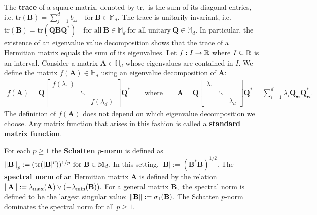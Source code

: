   The \textbf{trace} of a square matrix, denoted by $\mathrm{tr},$
  is the sum of its diagonal entries, i.e. 
  $
    \mathrm{tr}(\mathbf{B})
    =
    \sum_{j=1}^{d}b_{jj}
    \quad 
    \text{for}\ 
    \mathbf{B} \in \mathbb{M}_d.
  $
  The trace is unitarily invariant, i.e.
  $
    \mathrm{tr}(\mathbf{B})
    =
    \mathrm{tr}(\mathbf{Q}\mathbf{B}\mathbf{Q}^*)
    \quad 
    \text{for all}
    \ 
    \mathbf{B}\in \mathbb{M}_d
    \ 
    \text{for all unitary}\ 
    \mathbf{Q} \in \mathbb{M}_d.
  $
  In particular, the existence of an eigenvalue value decomposition shows 
  that the trace of a Hermitian matrix equals the sum of its  eigenvalues.
  Let
  $
  f: I\to \mathbb{R}
  $
  where 
  $I\subseteq\mathbb{R}$ 
  is an interval.
  Consider a matrix 
  $\mathbf{A}\in \mathbb{H}_d$
  whose eigenvalues are contained in $I.$
  We define the matrix 
  $
    f(\mathbf{A})\in \mathbb{H}_d
  $
  using an eigenvalue decomposition of $\mathbf{A}:$
  \begin{gather}
    f(\mathbf{A})
    =
    \mathbf{Q}
    \begin{bmatrix}
      f(\lambda_1) &&\\
                   &\ddots&\\
                   && f(\lambda_d)
    \end{bmatrix}
    \mathbf{Q}^*
    \qquad
    \text{where}
    \qquad
    \mathbf{A}
    =
    \mathbf{Q}
    \begin{bmatrix}
      \lambda_1 &&\\
                   &\ddots&\\
                   && \lambda_d
    \end{bmatrix}
    \mathbf{Q}^*
    =
    \sum_{i=1}^{d} 
    \lambda_i
    \mathbf{Q}_{\bullet i}
    \mathbf{Q}_{\bullet i}^*
    .
  \end{gather}
  The definition of $f(\mathbf{A})$ does not depend on which 
  eigenvalue decomposition we choose.
  Any matrix function that arises in this fashion is called a \textbf{standard matrix function}.

  For each $p\ge 1$
  the \textbf{Schatten $p$-norm} is defined as 
  $
    \norm{\mathbf{B}}_p
    :=
    (
    \mathrm{tr}(\left| \mathbf{B} \right|^p)
    )
    ^{1/p}
    \ 
    \text{for}
    \ 
    \mathbf{B} \in \mathbb{M}_d.
  $
  In this setting,
  $
  \left| \mathbf{B} \right|
  :=
  (
    \mathbf{B}^*
    \mathbf{B}
    )^{1/2}
    .
  $
  The \textbf{spectral norm}
  of an Hermitian matrix $\mathbf{A}$
  is defined by the relation
  $
    \left\lVert\mathbf{A}\right\rVert
    :=
    \lambda_{\mathrm{max}}(\mathbf{A})
    \lor
    (
    -\lambda_{\mathrm{min}}(\mathbf{B})
    )
    .
  $
  For a general matrix $\mathbf{B},$
  the spectral norm is defined to be the largest singular value:
  $
    \left\lVert\mathbf{B}\right\rVert
    :=
    \sigma_1(\mathbf{B})
    .
  $
  The Schatten $p$-norm dominates the spectral norm for all $p\ge 1.$




   
